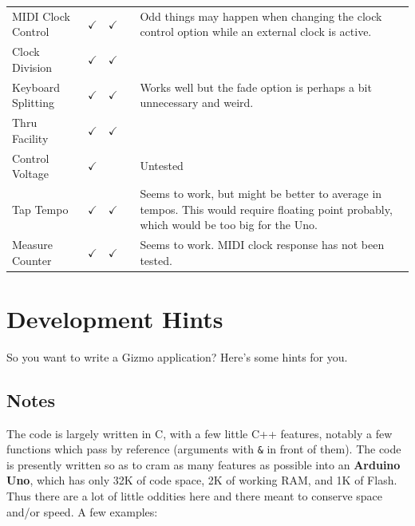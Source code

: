 \documentclass{article}
\begin{document}
\begin{center}
{\begin{tabular}{@{}llllp{2.8in}@{}}
MIDI Clock Control& $\checkmark$ & $\checkmark$ & &Odd things may happen when changing the clock control option while an external clock is active.\\
Clock Division&$\checkmark$&$\checkmark$& &\\
Keyboard Splitting& $\checkmark$ & $\checkmark$  & & Works well but the fade option is perhaps a bit unnecessary and weird.\\
Thru Facility & $\checkmark$ & $\checkmark$ & & \\
Control Voltage& $\checkmark$ & & & Untested\\
Tap Tempo & $\checkmark$ & $\checkmark$& & Seems to work, but might be better to average in tempos.  This would require floating point probably, which would be too big for the Uno.\\
Measure Counter & $\checkmark$ & $\checkmark$& & Seems to work.  MIDI clock response has not been tested.
\end{tabular}
}
\end{center}




\section{Development Hints}

So you want to write a Gizmo application?  Here's some hints for you.

\subsection{Notes}

The code is largely written in C, with a few little C++ features, notably
a few functions which pass by reference (arguments with \texttt{\&} in front of them).  The
code is presently written so as to cram as many features as possible into an
{\bf Arduino Uno}, which has only 32K of code space, 2K of working RAM, and 1K of Flash.  
Thus there are a lot of little oddities here and there meant to conserve space and/or
speed.  A few examples:
\end{document}
